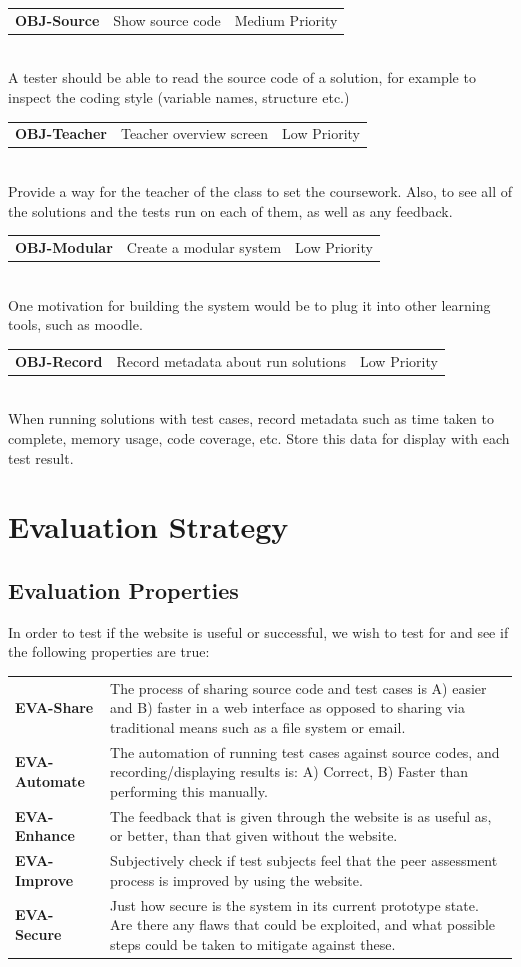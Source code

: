 \documentclass[a4paper,11pt]{report}
\newcommand{\objitem}[4]{\begin{tabularx}{\textwidth}{lXr} \textbf{OBJ-#1} & #2 & #3\end{tabularx}\\#4\\}
\begin{document}
\objitem{Source}{Show source code}{Medium Priority}{A tester should be able to read the source code of a solution, for example to inspect the coding style (variable names, structure etc.)}
\objitem{Teacher}{Teacher overview screen}{Low Priority}{Provide a way for the teacher of the class to set the coursework. Also, to see all of the solutions and the tests run on each of them, as well as any feedback.}
\objitem{Modular}{Create a modular system}{Low Priority}{One motivation for building the system would be to plug it into other learning tools, such as moodle.}
\objitem{Record}{Record metadata about run solutions}{Low Priority}{When running solutions with test cases, record metadata such as time taken to complete, memory usage, code coverage, etc. Store this data for display with each test result.}



\chapter{Evaluation Strategy}

\section{Evaluation Properties}
In order to test if the website is useful or successful, we wish to test for and see if the following properties are true:\\
\begin{tabularx}{\textwidth}{lX}
 \textbf{EVA-Share} & The process of sharing source code and test cases is A) easier and B) faster in a web interface as opposed to sharing via traditional means such as a file system or email.\\
 \textbf{EVA-Automate} & The automation of running test cases against source codes, and recording/displaying results is: A) Correct, B) Faster than performing this manually.\\
 \textbf{EVA-Enhance} & The feedback that is given through the website is as useful as, or better, than that given without the website.\\
 \textbf{EVA-Improve} & Subjectively check if test subjects feel that the peer assessment process is improved by using the website.\\
\textbf{EVA-Secure} & Just how secure is the system in its current prototype state. Are there any flaws that could be exploited, and what possible steps could be taken to mitigate against these.
\end{tabularx}
\end{document}
